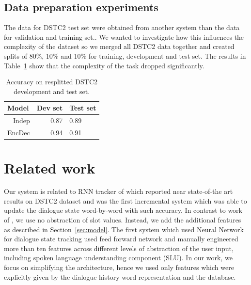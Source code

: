 \documentclass{itatnew}
\def\todo#1{\textcolor{purple}{todo: \textit{#1}}}
\begin{document}
\subsection{Data preparation experiments}
\label{sec:split}
The data for DSTC2 test set were obtained from another system than the data for validation and training set.\cite{henderson2014second}.
We wanted to investigate how this influences the complexity of the dataset so we merged all DSTC2 data together and created splits of 80\%, 10\% and 10\% for training, development and test set.
The results in Table~\ref{tab:resplit} show that the complexity of the task dropped significantly.

\begin{table}
\caption{Accuracy on resplitted DSTC2 development and test set.}
\begin{center}
\begin{tabular}{r@{\quad}rll}
\hline
\multicolumn{1}{l}{\rule{0pt}{12pt}
                   Model}&\multicolumn{1}{l}{Dev set}&\multicolumn{2}{l}{Test set}\\[2pt]
\hline\rule{0pt}{12pt}
Indep  &   0.87 & 0.89 \\
EncDec &   0.94 & 0.91 \\
\hline
\end{tabular}
\end{center}
\label{tab:resplit}
\end{table}

\section{Related work}
\label{sec:related}
Our system is related to RNN tracker of \cite{zilka2015incremental}
which reported near state-of-the art results on DSTC2 dataset and was the first incremental system which was able to update the dialogue state word-by-word with such accuracy.
In contrast to work of \cite{zilka2015incremental}, we use no abstraction of slot values. Instead, we add the additional features as described in Section~\ref{sec:model}.
The first system which used Neural Network for dialogue state tracking \cite{henderson2013deep} used feed forward network and manually engineered more than ten features across different levels of abstraction of the user input, including spoken language understanding component (SLU).
In our work, we focus on simplifying the architecture, hence we used only features which were explicitly given by the dialogue history word representation and the database.
\end{document}
